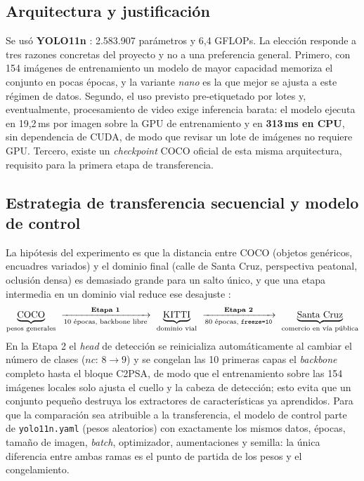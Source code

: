 \documentclass[10pt,a4paper]{article}
\begin{document}
\subsection{Arquitectura y justificación}
Se usó \textbf{YOLO11n} \cite{yolo11,ultralytics}: 2{.}583{.}907 parámetros y 6{,}4
GFLOPs. La elección responde a tres razones concretas del proyecto y no a una preferencia
general. Primero, con 154 imágenes de entrenamiento un modelo de mayor capacidad memoriza
el conjunto en pocas épocas, y la variante \emph{nano} es la que mejor se ajusta a este
régimen de datos. Segundo, el uso previsto pre-etiquetado por lotes y, eventualmente,
procesamiento de video exige inferencia barata: el modelo ejecuta en 19{,}2\,ms por
imagen sobre la GPU de entrenamiento y en \textbf{313\,ms en CPU}, sin dependencia de
CUDA, de modo que revisar un lote de imágenes no requiere GPU. Tercero, existe un
\emph{checkpoint} COCO \cite{coco} oficial de esta misma arquitectura, requisito para la
primera etapa de transferencia.

\subsection{Estrategia de transferencia secuencial y modelo de control}
La hipótesis del experimento es que la distancia entre COCO (objetos genéricos, encuadres
variados) y el dominio final (calle de Santa Cruz, perspectiva peatonal, oclusión densa)
es demasiado grande para un salto único, y que una etapa intermedia en un dominio vial
reduce ese desajuste \cite{yosinski}:
\[
\underbrace{\text{COCO}}_{\text{pesos generales}}
\ \xrightarrow[\text{10 épocas, backbone libre}]{\textbf{Etapa 1}}\
\underbrace{\text{KITTI}}_{\text{dominio vial}}
\ \xrightarrow[\text{80 épocas, \texttt{freeze=10}}]{\textbf{Etapa 2}}\
\underbrace{\text{Santa Cruz}}_{\text{comercio en vía pública}}
\]
En la Etapa 2 el \emph{head} de detección se reinicializa automáticamente al cambiar el
número de clases ($nc$: $8 \rightarrow 9$) y se congelan las 10 primeras capas el
\emph{backbone} completo hasta el bloque C2PSA, de modo que el entrenamiento sobre las
154 imágenes locales solo ajusta el cuello y la cabeza de detección; esto evita que un
conjunto pequeño destruya los extractores de características ya aprendidos. Para que la
comparación sea atribuible a la transferencia, el modelo de control parte de
\texttt{yolo11n.yaml} (pesos aleatorios) con exactamente los mismos datos, épocas, tamaño
de imagen, \emph{batch}, optimizador, aumentaciones y semilla: la única diferencia entre
ambas ramas es el punto de partida de los pesos y el congelamiento.
\end{document}
